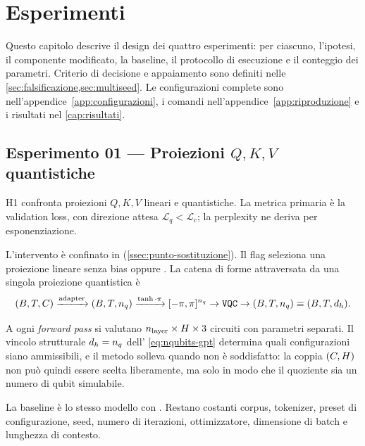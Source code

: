 \chapter{Esperimenti}
\label{cap:esperimenti}

Questo capitolo descrive il design dei quattro esperimenti: per ciascuno,
l'ipotesi, il componente modificato, la baseline, il protocollo di
esecuzione e il conteggio dei parametri. Criterio di decisione e appaiamento sono
definiti nelle \cref{sec:falsificazione,sec:multiseed}. Le
configurazioni complete sono nell'appendice~\ref{app:configurazioni}, i
comandi nell'appendice~\ref{app:riproduzione} e i risultati nel \cref{cap:risultati}.

\section{Esperimento 01 --- Proiezioni \texorpdfstring{$Q,K,V$}{Q,K,V} quantistiche}
\label{sec:esp-gpt}

H1 confronta proiezioni $Q,K,V$ lineari e quantistiche. La metrica primaria è la
validation loss, con direzione attesa $\mathcal{L}_q<\mathcal{L}_c$; la perplexity
ne deriva per esponenziazione.

L'intervento è confinato in 
(\cref{ssec:punto-sostituzione}). Il flag  seleziona una
proiezione lineare senza bias oppure . La catena di
forme attraversata da una singola proiezione quantistica è
\begin{equation}
  (B, T, C)
  \xrightarrow{\text{adapter}} (B, T, n_q)
  \xrightarrow{\tanh\cdot\pi} [-\pi,\pi]^{n_q}
  \to \texttt{VQC}
  \to (B, T, n_q) \equiv (B, T, d_h).
  \label{eq:shapes-gpt-quantum}
\end{equation}

A ogni \emph{forward pass} si valutano $n_{\text{layer}} \times H \times 3$
circuiti con parametri separati. Il vincolo strutturale $d_h = n_q$
dell'
\cref{eq:nqubits-gpt} determina quali configurazioni siano ammissibili, e il
metodo solleva  quando non è soddisfatto: la coppia
$(C, H)$ non può quindi essere scelta liberamente, ma solo in modo che il
quoziente sia un numero di qubit simulabile.

La baseline è lo stesso modello con . Restano costanti
corpus, tokenizer, preset di configurazione, seed, numero di iterazioni,
ottimizzatore, dimensione di batch e lunghezza di contesto.

